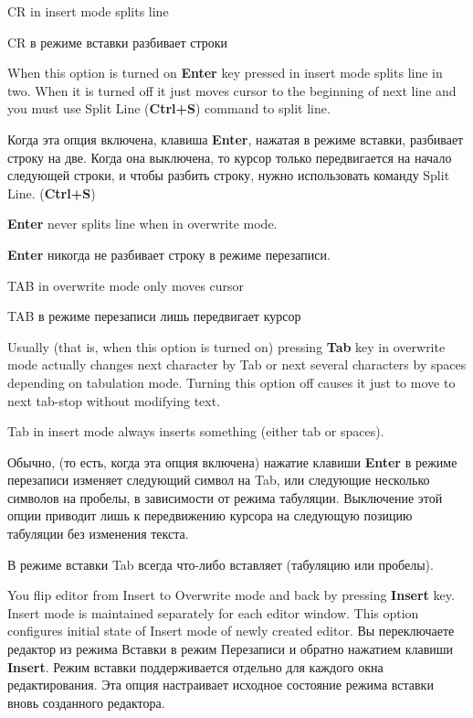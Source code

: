 \begin{popup}
\ifenglish
\caption{CR in insert mode splits line}
\else
\caption{CR в режиме вставки разбивает строки}
\fi
{}
\ifenglish
When this option is turned on {\bf Enter} key pressed in insert mode splits
line in two. When it is turned off it just moves cursor to the beginning of next line
and you must use Split Line ({\bf Ctrl+S}) command to split line.

\else
Когда эта опция включена, клавиша {\bf Enter}, нажатая в режиме вставки, разбивает
строку на две. Когда она выключена, то курсор только передвигается на начало
следующей строки, и чтобы разбить строку, нужно использовать команду Split Line.
({\bf Ctrl+S})
\fi
\end{popup}

\ifenglish
{\bf Enter} never splits line when in overwrite mode.

\else
{\bf Enter} никогда не разбивает строку в режиме перезаписи.
\fi

\begin{popup}
\ifenglish
\caption{TAB in overwrite mode only moves cursor}
\else
\caption{TAB в режиме перезаписи лишь передвигает курсор}
\fi
{}

\ifenglish
Usually (that is, when this option is turned on) pressing {\bf Tab} key in overwrite mode
actually changes next character by Tab or next several characters by spaces depending
on tabulation mode. Turning this option off causes it just to move to next tab-stop
without modifying text.

Tab in insert mode always inserts something (either tab or spaces).

\else
Обычно, (то есть, когда эта опция включена) нажатие клавиши {\bf Enter} в режиме
перезаписи изменяет следующий символ на Tab, или следующие несколько символов на
пробелы, в зависимости от режима табуляции. Выключение этой опции приводит лишь к
передвижению курсора на следующую позицию табуляции без изменения текста.

В режиме вставки Tab всегда что-либо вставляет (табуляцию или пробелы).
\fi
\end{popup}

\begin{popup}
\caption{}
\ifenglish
You flip editor from Insert to Overwrite mode and back by pressing {\bf Insert} key.
Insert mode is maintained separately for each editor window. This option configures
initial state of Insert mode of newly created editor.
\else
Вы переключаете редактор из режима Вставки в режим Перезаписи и обратно нажатием
клавиши {\bf Insert}. Режим вставки поддерживается отдельно для каждого окна
редактирования. Эта опция настраивает исходное состояние режима вставки вновь
созданного редактора.
\fi
\end{popup}


